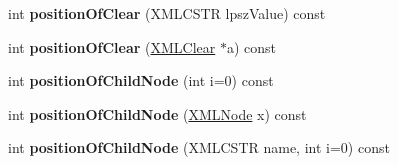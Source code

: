 \begin{DoxyCompactItemize}
\item 
int {\bfseries position\+Of\+Clear} (X\+M\+L\+C\+S\+TR lpsz\+Value) const \hypertarget{struct_x_m_l_node_ab5c0635a6b2fc763d0dc2b3ec2ddd672}{}\label{struct_x_m_l_node_ab5c0635a6b2fc763d0dc2b3ec2ddd672}

\item 
int {\bfseries position\+Of\+Clear} (\hyperlink{struct_x_m_l_clear}{X\+M\+L\+Clear} $\ast$a) const \hypertarget{struct_x_m_l_node_a2d3e0815542ef4903f6f995f41603285}{}\label{struct_x_m_l_node_a2d3e0815542ef4903f6f995f41603285}

\item 
int {\bfseries position\+Of\+Child\+Node} (int i=0) const \hypertarget{struct_x_m_l_node_ab55fa67b8102ac2246c8cad645ee1cfd}{}\label{struct_x_m_l_node_ab55fa67b8102ac2246c8cad645ee1cfd}

\item 
int {\bfseries position\+Of\+Child\+Node} (\hyperlink{struct_x_m_l_node}{X\+M\+L\+Node} x) const \hypertarget{struct_x_m_l_node_a2e800afea7299047729379bc9e6765e4}{}\label{struct_x_m_l_node_a2e800afea7299047729379bc9e6765e4}

\item 
int {\bfseries position\+Of\+Child\+Node} (X\+M\+L\+C\+S\+TR name, int i=0) const \hypertarget{struct_x_m_l_node_acb57e737ccd72f723e7b0591d64a7713}{}\label{struct_x_m_l_node_acb57e737ccd72f723e7b0591d64a7713}

\end{DoxyCompactItemize}
